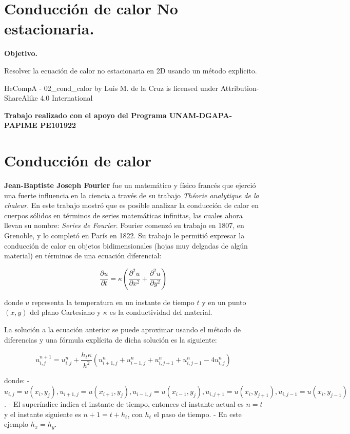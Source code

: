 \documentclass[
  letterpaper,
  DIV=11,
  numbers=noendperiod]{scrreprt}
\begin{document}
\chapter{Conducción de calor No
estacionaria.}\label{conducciuxf3n-de-calor-no-estacionaria.}

\textbf{Objetivo.}

Resolver la ecuación de calor no estacionaria en 2D usando un método
explícito.

HeCompA - 02\_cond\_calor by Luis M. de la Cruz is licensed under
Attribution-ShareAlike 4.0 International

\textbf{Trabajo realizado con el apoyo del Programa UNAM-DGAPA-PAPIME
PE101922}


\chapter{Conducción de calor}\label{conducciuxf3n-de-calor}

\textbf{Jean-Baptiste Joseph Fourier} fue un matemático y físico francés
que ejerció una fuerte influencia en la ciencia a través de su trabajo
\emph{Théorie analytique de la chaleur}. En este trabajo mostró que es
posible analizar la conducción de calor en cuerpos sólidos en términos
de series matemáticas infinitas, las cuales ahora llevan su nombre:
\emph{Series de Fourier}. Fourier comenzó su trabajo en 1807, en
Grenoble, y lo completó en París en 1822. Su trabajo le permitió
expresar la conducción de calor en objetos bidimensionales (hojas muy
delgadas de algún material) en términos de una ecuación diferencial:

\[
\dfrac{\partial u}{ \partial t} = \kappa \left(\dfrac{\partial^2 u}{ \partial x^2} + \dfrac{\partial^2 u}{ \partial y^2}\right)
\]

donde \(u\) representa la temperatura en un instante de tiempo \(t\) y
en un punto \((x,y)\) del plano Cartesiano y \(\kappa\) es la
conductividad del material.

La solución a la ecuación anterior se puede aproximar usando el método
de diferencias y una fórmula explícita de dicha solución es la
siguiente:

\[
u_{i,j}^{n+1} = u_{i,j}^n + \dfrac{h_t\kappa}{h^2} 
\left(u_{i+1,j}^n + u_{i-1,j}^n + u_{i,j+1}^n + u_{i,j-1}^n - 4u_{i,j}^n\right) 
\]

donde: -
\(u_{i,j} = u(x_i, y_j), u_{i+1,j} = u(x_{i+1}, y_j), u_{i-1,j} = u(x_{i-1}, y_j), u_{i,j+1} = u(x_i, y_{j+1}), u_{i,j-1} = u(x_i, y_{j-1})\).
- El superíndice indica el instante de tiempo, entonces el instante
actual es \(n = t\) y el instante siguiente es \(n+1 = t + h_t\), con
\(h_t\) el paso de tiempo. - En este ejemplo \(h_x = h_y\).
\end{document}
